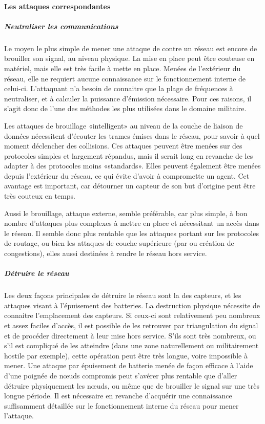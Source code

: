         \paragraph{Les attaques correspondantes}
            \subparagraph{Neutraliser les communications}
Le moyen le plus simple de mener une attaque de \dds contre un réseau est encore de brouiller son signal, au niveau physique.
La mise en place peut être couteuse en matériel, mais elle est très facile à mette en place.
Menées de l'extérieur du réseau, elle ne requiert aucune connaissance sur le fonctionnement interne de celui-ci.
L'attaquant n'a besoin de connaitre que la plage de fréquences à neutraliser, et à calculer la puissance d'émission nécessaire.
Pour ces raisons, il s'agit donc de l'une des méthodes les plus utilisées dans le domaine militaire.

Les attaques de brouillage «intelligent» au niveau de la couche de liaison de données nécessitent d'écouter les trames émises dans le réseau, pour savoir à quel moment déclencher des collisions.
Ces attaques peuvent être menées sur des protocoles simples et largement répandus, mais il serait long en revanche de les adapter à des protocoles moins «standards».
Elles peuvent également être menées depuis l'extérieur du réseau, ce qui évite d'avoir à compromette un agent.
Cet avantage est important, car détourner un capteur de son but d'origine peut être très couteux en temps.

Aussi le brouillage, attaque externe, semble préférable, car plus simple, à bon nombre d'attaques plus complexes à mettre en place et nécessitant un accès dans le réseau.
Il semble donc plus rentable que les attaques portant sur les protocoles de routage, ou bien les attaques de couche supérieure (par \desync ou création de congestions), elles aussi destinées à rendre le réseau hors service.

            \subparagraph{Détruire le réseau}
Les deux façons principales de détruire le réseau sont la  des capteurs, et les attaques visant à l'épuisement des batteries.
La destruction physique nécessite de connaitre l'emplacement des capteurs.
Si ceux-ci sont relativement peu nombreux et assez faciles d'accès, il est possible de les retrouver par triangulation du signal et de procéder directement à leur mise hors service.
S'ils sont très nombreux, ou s'il est compliqué de les atteindre (dans une zone naturellement ou militairement hostile par exemple), cette opération peut être très longue, voire impossible à mener.
Une attaque par épuisement de batterie menée de façon efficace à l'aide d'une poignée de nœuds compromis peut s'avérer plus rentable que d'aller détruire physiquement les nœuds, ou même que de brouiller le signal sur une très longue période.
Il est nécessaire en revanche d'acquérir une connaissance suffisamment détaillée sur le fonctionnement interne du réseau pour mener l'attaque.


